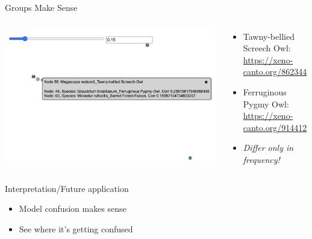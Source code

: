 \begin{frame}{Groups Make Sense}
    \begin{columns}
        \begin{column}{0.5\textwidth}
            \includegraphics[height=0.7\textheight, width=1\textwidth]{images/owl_owl.png}
        \end{column}
        \begin{column}{0.5\textwidth}
            \begin{itemize}
                \item Tawny-bellied Screech Owl: \href{https://xeno-canto.org/862344}{https://xeno-canto.org/862344}
                \item Ferruginous Pygmy Owl: \href{https://xeno-canto.org/914412}{https://xeno-canto.org/914412}
                \item \emph{Differ only in frequency!}
            \end{itemize}
        \end{column}
    \end{columns}
\end{frame}

\begin{frame}{Interpretation/Future application}
    \begin{itemize}
        \item Model confusion makes sense
        \item See where it's getting confused
    \end{itemize}
\end{frame}


